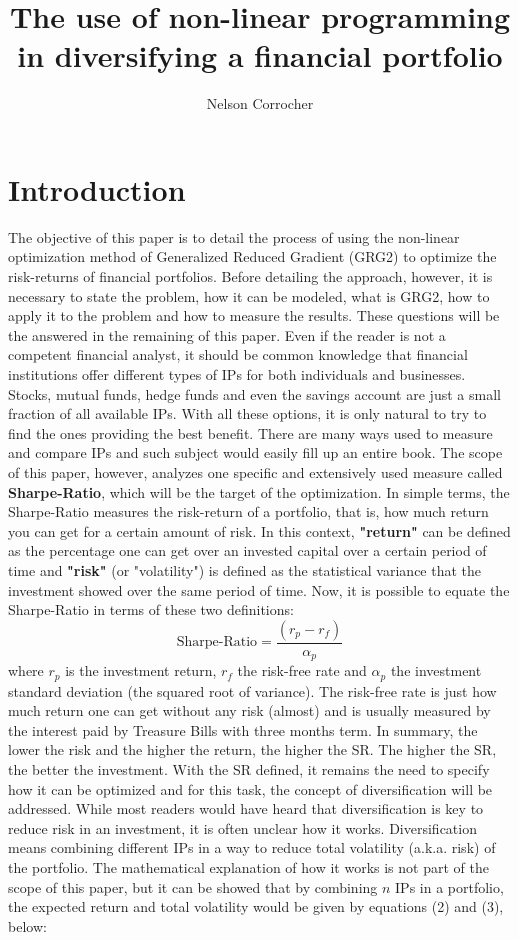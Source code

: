 \documentclass[a4paper,man,natbib]{apa6}
\title{The use of non-linear programming in diversifying a financial portfolio}
\author{Nelson Corrocher}
\affiliation{Harrisburg University}
\begin{document}
	\maketitle
	
	\section{Introduction}
	The objective of this paper is to detail the process of using the non-linear optimization method of Generalized Reduced Gradient (GRG2) to optimize the risk-returns of financial portfolios.
	Before detailing the approach, however, it is necessary to state the problem, how it can be modeled, what is GRG2, how to apply it to the problem and how to measure the results. These questions will be the answered in the remaining of this paper.
	Even if the reader is not a competent financial analyst, it should be common knowledge that financial institutions offer different types of IPs for both individuals and businesses. Stocks, mutual funds, hedge funds and even the savings account are just a small fraction of all available IPs. With all these options, it is only natural to try to find the ones providing the best benefit.
	There are many ways used to measure and compare IPs and such subject would easily fill up an entire book. The scope of this paper, however, analyzes one specific and extensively used measure called \textbf{Sharpe-Ratio}, which will be the target of the optimization. In simple terms, the Sharpe-Ratio measures the risk-return of a portfolio, that is, how much return you can get for a certain amount of risk. In this context, \textbf{"return"} can be defined as the percentage one can get over an invested capital over a certain period of time and \textbf{"risk"} (or "volatility") is defined as the statistical variance that the investment showed over the same period of time. Now, it is possible to equate the Sharpe-Ratio in terms of these two definitions:
	\begin{equation}
	\text{Sharpe-Ratio} = \frac{(r_p - r_f)}{\alpha_p}
	\end{equation}
	where $r_p$ is the investment return, $r_f$ the risk-free rate and $\alpha_p$ the investment standard deviation (the squared root of variance). The risk-free rate is just how much return one can get without any risk (almost) and is usually measured by the interest paid by Treasure Bills with three months term. In summary, the lower the risk and the higher the return, the higher the SR. The higher the SR, the better the investment.
	With the SR defined, it remains the need to specify how it can be optimized and for this task, the concept of diversification will be addressed. While most readers would have heard that diversification is key to reduce risk in an investment, it is often unclear how it works. Diversification means combining different IPs in a way to reduce total volatility (a.k.a. risk) of the portfolio. The mathematical explanation of how it works is not part of the scope of this paper, but it can be showed that by combining $n$ IPs in a portfolio, the expected return and total volatility would be given by equations (2) and (3), below:
\end{document}
